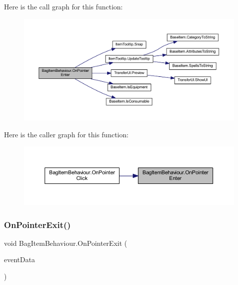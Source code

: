 Here is the call graph for this function\+:
\nopagebreak
\begin{figure}[H]
\begin{center}
\leavevmode
\includegraphics[width=350pt]{class_bag_item_behaviour_a9dd6c0fb07dd87363f0198070a16cff7_cgraph}
\end{center}
\end{figure}
Here is the caller graph for this function\+:
\nopagebreak
\begin{figure}[H]
\begin{center}
\leavevmode
\includegraphics[width=350pt]{class_bag_item_behaviour_a9dd6c0fb07dd87363f0198070a16cff7_icgraph}
\end{center}
\end{figure}
\mbox{\label{class_bag_item_behaviour_a94a401c7a518b7ed17e5648153d6f1b6}} 
\subsubsection{\texorpdfstring{OnPointerExit()}{OnPointerExit()}}
{\footnotesize\ttfamily void Bag\+Item\+Behaviour.\+On\+Pointer\+Exit (\begin{DoxyParamCaption}\item[{Pointer\+Event\+Data}]{event\+Data }\end{DoxyParamCaption})}

